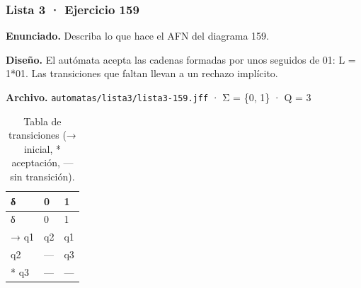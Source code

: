 \hypertarget{lista-3-ejercicio-159}{%
\subsubsection{Lista 3 · Ejercicio 159}\label{lista-3-ejercicio-159}}

\textbf{Enunciado.} Describa lo que hace el AFN del diagrama 159.

\textbf{Diseño.} El autómata acepta las cadenas formadas por unos seguidos de 01: L = 1*01. Las transiciones que faltan llevan a un rechazo implícito.

\textbf{Archivo.} \texttt{automatas/lista3/lista3-159.jff} · Σ = \{0, 1\} · \textbar Q\textbar{} = 3

\begin{longtable}[]{@{}lll@{}}
\caption{Tabla de transiciones (→ inicial, * aceptación, --- sin transición).}\tabularnewline
\toprule\noalign{}
δ & 0 & 1 \\
\midrule\noalign{}
\endfirsthead
\toprule\noalign{}
δ & 0 & 1 \\
\midrule\noalign{}
\endhead
\bottomrule\noalign{}
\endlastfoot
→ q1 & q2 & q1 \\
q2 & --- & q3 \\
* q3 & --- & --- \\
\end{longtable}


